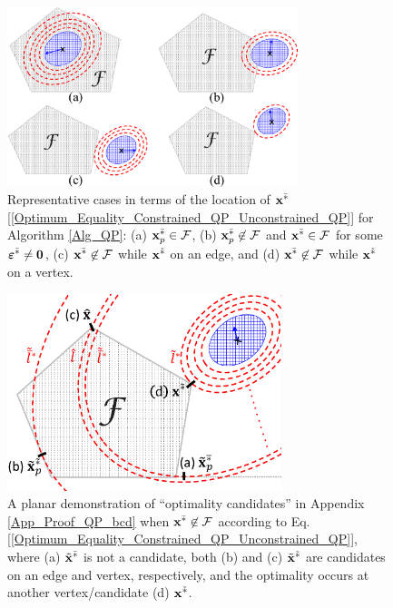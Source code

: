 \documentclass[9pt,twocolumn,twoside,lineno]{pnas-new-1}
\newcommand{\bfx}{{\bf x}}
\newcommand{\bfvarepsilon}{{\boldsymbol \varepsilon}}
\newcommand{\bfzero}{{\bf 0}}
\newcommand{\calF}{{\mathcal F}}
\theoremstyle{remark}
\begin{document}
\begin{figure}[htbp]
    \begin{center}
    \includegraphics[width=8.5cm]{Fig_Locations.eps}
    \caption{Representative cases in terms of the location of $\bfx^{\bar *}$ {\rm[\ref{Optimum_Equality_Constrained_QP_Unconstrained_QP}]} for Algorithm {\rm\ref{Alg_QP}}: (a) $\bfx_p^{\bar *}\in\calF$, (b) $\bfx_p^{\bar *}\not\in\calF$ and $\bfx^{\bar *}\in\calF$ for some $\bfvarepsilon^{\bar *}\ne\bfzero$, (c) $\bfx^{\bar *}\not\in\calF$ while $\bfx^{\tilde *}$ on an edge, and (d) $\bfx^{\bar *}\not\in\calF$ while $\bfx^{\tilde *}$ on a vertex.}
    \label{Fig_Locations}
    \end{center}
\end{figure}

\begin{figure}[htbp]
    \begin{center}
    \includegraphics[width=8cm]{Fig_Candidates.eps}
    \caption{A planar demonstration of ``optimality candidates'' in Appendix {\rm\ref{App_Proof_QP_bcd}} when $\bfx^{\bar *}\not\in\calF$ according to Eq. {\rm[\ref{Optimum_Equality_Constrained_QP_Unconstrained_QP}]}, where (a) $\tilde\bfx^{\bar *}$ is not a candidate, both (b) and (c) $\tilde\bfx^{\tilde *}$ are candidates on an edge and vertex, respectively, and the optimality occurs at another vertex/candidate (d) $\bfx^{\tilde *}$.}
    \label{Fig_Candidates}
    \end{center}
\end{figure}
\end{document}
